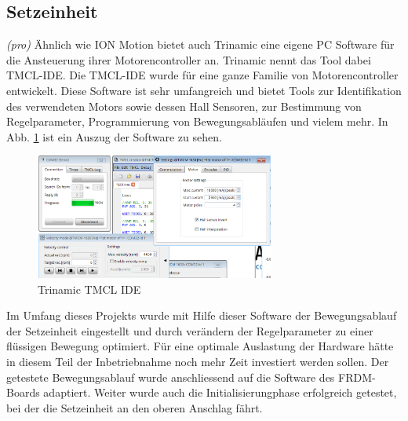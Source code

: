 \subsection{Setzeinheit} \label{sec:Inbetriebnahme_Setzeinheit}
\textit{(pro)} Ähnlich wie ION Motion bietet auch Trinamic eine eigene PC Software für die Ansteuerung ihrer Motorencontroller an. Trinamic nennt das Tool dabei TMCL-IDE. Die TMCL-IDE wurde für eine ganze Familie von Motorencontroller entwickelt. Diese Software ist sehr umfangreich und bietet Tools zur Identifikation des verwendeten Motors sowie dessen Hall Sensoren, zur Bestimmung von Regelparameter, Programmierung von Bewegungsabläufen und vielem mehr. In Abb. \ref{fig:TMCL-IDE} ist ein Auszug der Software zu sehen.

\begin{figure}[H]
	\includegraphics[width=0.7\textwidth]{Illustrationen/7-Inbetriebnahme_und_Kalibration/TMCL_IDE.png}
	\caption{Trinamic TMCL IDE}
	\label{fig:TMCL-IDE}
\end{figure}

Im Umfang dieses Projekts wurde mit Hilfe dieser Software der Bewegungsablauf der Setzeinheit eingestellt und durch verändern der Regelparameter zu einer flüssigen Bewegung optimiert. Für eine optimale Auslastung der Hardware hätte in diesem Teil der Inbetriebnahme noch mehr Zeit investiert werden sollen. Der getestete Bewegungsablauf wurde anschliessend auf die Software des FRDM-Boards adaptiert. Weiter wurde auch die Initialisierungphase erfolgreich getestet, bei der die Setzeinheit an den oberen Anschlag fährt.

